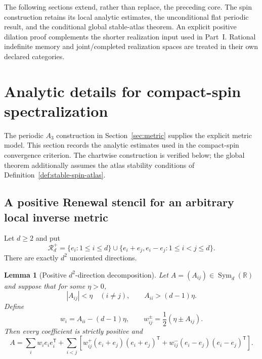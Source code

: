 \documentclass[11pt]{article}
\newtheorem{lemma}[lemma]{Lemma}
\theoremstyle{definition}
\theoremstyle{remark}
\theoremstyle{definition}
\theoremstyle{remark}
\begin{document}
The following sections extend, rather than replace, the preceding core.
The spin construction retains its local analytic estimates, the unconditional
flat periodic result, and the conditional global stable-atlas theorem.
An explicit positive dilation proof complements the shorter realization input
used in Part~I.  Rational indefinite memory and joint/completed realization
spaces are treated in their own declared categories.

\section{Analytic details for compact-spin spectralization}
\label{app:compact-spin}

The periodic $A_3$ construction in Section~\ref{sec:metric} supplies the explicit metric model.  This section records the analytic estimates used in the compact-spin convergence criterion.  The chartwise construction is verified below; the global theorem additionally assumes the atlas stability conditions of Definition~\ref{def:stable-spin-atlas}.

\subsection{A positive Renewal stencil for an arbitrary local inverse metric}

Let $d\ge2$ and put
\begin{equation}
\mathcal R_d^+
=\{e_i:1\le i\le d\}
\cup\{e_i+e_j,e_i-e_j:1\le i<j\le d\}.
\label{eq:supp-general-stencil}
\end{equation}
There are exactly $d^2$ unoriented directions.

\begin{lemma}[Positive $d^2$-direction decomposition]
\label{lem:supp-positive-decomposition}
Let $A=(A_{ij})\in\operatorname{Sym}_d(\mathbb R)$ and suppose that for some
$\eta>0$,
\begin{equation}
|A_{ij}|<\eta\quad(i\ne j),
\qquad
A_{ii}>(d-1)\eta.
\label{eq:supp-stencil-window}
\end{equation}
Define
\begin{equation}
w_i=A_{ii}-(d-1)\eta,
\qquad
w_{ij}^{\pm}=\frac12(\eta\pm A_{ij}).
\label{eq:supp-stencil-weights}
\end{equation}
Then every coefficient is strictly positive and
\begin{equation}
{
A=\sum_iw_ie_ie_i^{\mathsf T}
+\sum_{i<j}\left[
 w_{ij}^+(e_i+e_j)(e_i+e_j)^{\mathsf T}
+w_{ij}^-(e_i-e_j)(e_i-e_j)^{\mathsf T}
\right].}
\label{eq:supp-positive-decomposition}
\end{equation}
\end{lemma}
\end{document}

